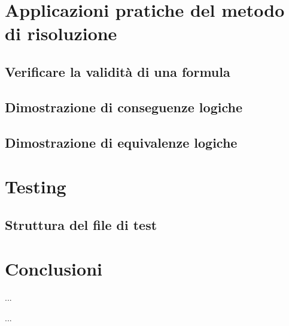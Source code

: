 \documentclass[a4paper,12pt]{report}
\begin{document}
% 
% 
\chapter{Applicazioni pratiche del metodo di risoluzione}
\label{app}

\section{Verificare la validità di una formula}
\section{Dimostrazione di conseguenze logiche}
\section{Dimostrazione di equivalenze logiche}

% 
% 
\chapter{Testing}
\label{testing}

\section{Struttura del file di test}

% 
% 
\chapter{Conclusioni}
\label{conclusion}

%
%
\begin{thebibliography}{00}



%
...
%
%
\end{thebibliography}
% 

%
%
...
\end{document}

